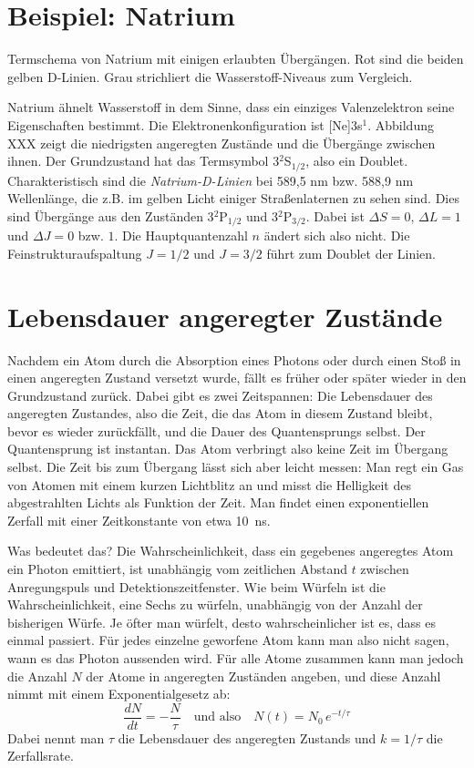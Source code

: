 \section{Beispiel: Natrium}

\begin{marginfigure}
    \caption{Termschema von Natrium mit einigen erlaubten Übergängen. Rot sind die beiden gelben D-Linien. Grau strichliert die Wasserstoff-Niveaus zum Vergleich.}
\end{marginfigure}

Natrium ähnelt Wasserstoff in dem Sinne, dass ein einziges Valenzelektron seine Eigenschaften bestimmt. Die Elektronenkonfiguration ist [Ne]3s$^1$. Abbildung XXX zeigt die niedrigsten angeregten Zustände und die Übergänge zwischen ihnen. Der Grundzustand hat das Termsymbol 3$^2$S$_{1/2}$, also ein Doublet. Charakteristisch sind die \emph{Natrium-D-Linien} bei 589,5 nm bzw. 588,9 nm Wellenlänge, die z.B. im gelben Licht einiger Straßenlaternen zu sehen sind.
Dies sind Übergänge aus den Zuständen 3$^2$P$_{1/2}$ und 3$^2$P$_{3/2}$. Dabei ist $\Delta S = 0$, $\Delta L = 1$ und $\Delta J = 0$ bzw. $1$. Die Hauptquantenzahl $n$ ändert sich also nicht. Die Feinstrukturaufspaltung $J = 1/2$ und $J=3/2$ führt zum Doublet der Linien.

\section{Lebensdauer angeregter Zustände}

Nachdem ein Atom durch die Absorption eines Photons oder durch einen Stoß in einen angeregten Zustand versetzt wurde, fällt es früher oder später wieder in den Grundzustand zurück. Dabei gibt es zwei Zeitspannen: Die Lebensdauer des angeregten Zustandes, also die Zeit, die das Atom in diesem Zustand bleibt, bevor es wieder zurückfällt, und die Dauer des Quantensprungs selbst. Der Quantensprung ist instantan. Das Atom verbringt also keine Zeit im Übergang selbst. Die Zeit bis zum Übergang lässt sich aber leicht messen: Man regt ein Gas von Atomen mit einem kurzen Lichtblitz an und misst die Helligkeit des abgestrahlten Lichts als Funktion der Zeit. Man findet einen exponentiellen Zerfall mit einer Zeitkonstante von etwa 10~ns.

Was bedeutet das? Die Wahrscheinlichkeit, dass ein gegebenes angeregtes Atom ein Photon emittiert, ist unabhängig vom zeitlichen Abstand $t$ zwischen Anregungspuls und Detektionszeitfenster. Wie beim Würfeln ist die Wahrscheinlichkeit, eine Sechs zu würfeln, unabhängig von der Anzahl der bisherigen Würfe. Je öfter man würfelt, desto wahrscheinlicher ist es, dass es einmal passiert. Für jedes einzelne geworfene Atom kann man also nicht sagen, wann es das Photon aussenden wird. Für alle Atome zusammen kann man jedoch die Anzahl $N$ der Atome in angeregten Zuständen angeben, und diese Anzahl nimmt mit einem Exponentialgesetz ab: 
\begin{equation}
    \frac{d N}{dt} = - \frac{N}{\tau} \quad \text{und also} \quad N(t) = N_0 \, e^{- t / \tau}
\end{equation} 
Dabei nennt man $\tau$ die Lebensdauer des angeregten Zustands und $k = 1 / \tau$ die Zerfallsrate.


